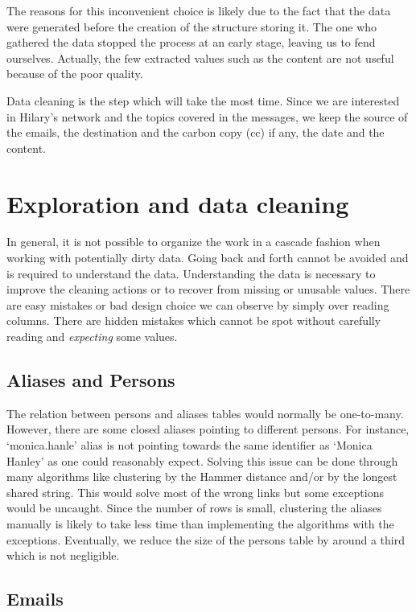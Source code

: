 \documentclass[11pt]{article}
\begin{document}
The reasons for this inconvenient choice is likely due to the fact that the data were generated before the creation of the structure storing it. The one who gathered the data stopped the process at an early stage, leaving us to fend ourselves. Actually, the few extracted values such as the content are not useful because of the poor quality.

Data cleaning is the step which will take the most time. Since we are interested in Hilary's network and the topics covered in the messages, we keep the source of the emails, the destination and the carbon copy (cc) if any, the date and the content.

\section{Exploration and data cleaning}

In general, it is not possible to organize the work in a cascade fashion when working with potentially dirty data. Going back and forth cannot be avoided and is required to understand the data. Understanding the data is necessary to improve the cleaning actions or to recover from missing or unusable values. There are easy mistakes or bad design choice we can observe by simply over reading columns. There are hidden mistakes which cannot be spot without carefully reading and \emph{expecting} some values.

\subsection{Aliases and Persons}

The relation between persons and aliases tables would normally be one-to-many. However, there are some closed aliases pointing to different persons. For instance, `monica.hanle' alias is not pointing towards the same identifier as `Monica Hanley' as one could reasonably expect. Solving this issue can be done through many algorithms like clustering by the Hammer distance and/or by the longest shared string. This would solve most of the wrong links but some exceptions would be uncaught. Since the number of rows is small, clustering the aliases manually is likely to take less time than implementing the algorithms with the exceptions. Eventually, we reduce the size of the persons table by around a third which is not negligible.

\subsection{Emails}
\end{document}
